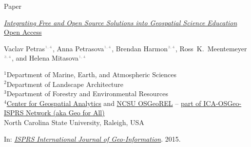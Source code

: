 \documentclass[xcolor={dvipsnames,usenames},beamer]{beamer}
\newcommand{\n}[1]{$^{\textcolor{gray}{\mbox{\tiny{#1}}}}$}
\begin{document}
\begin{frame}{Paper}

\href{http://www.mdpi.com/2220-9964/4/2/942}%
  {\emph{Integrating Free and Open Source Solutions into Geospatial Science Education}
  \hfill \footnotesize \color{gray} Open Access}

Vaclav Petras\n{1,\,4},
Anna Petrasova\n{1,\,4},
Brendan Harmon\n{2,\,4},
\mbox{Ross K. Meentemeyer}\n{3,\,4},
and Helena Mitasova\n{1,\,4}

\medskip

{\tiny
$^1$Department of Marine, Earth, and Atmospheric Sciences\\
$^2$Department of Landscape Architecture\\
$^3$Department of Forestry and Environmental Resources\\
$^4$\href{http://cnr.ncsu.edu/geospatial/}{Center for Geospatial Analytics}
and \href{http://geospatial.ncsu.edu/osgeorel/}{NCSU OSGeoREL}
  -- \href{www.geoforall.org}{part of ICA-OSGeo-ISPRS Network (aka \alert{Geo for All})}\\
}{\scriptsize
North Carolina State University, Raleigh, USA\\
}

\medskip

In: \href{http://www.mdpi.com/journal/ijgi/special_issues/science-applications}%
{\emph{ISPRS International Journal of Geo-Information}}. 2015.

\bigskip


\end{frame}
\end{document}
